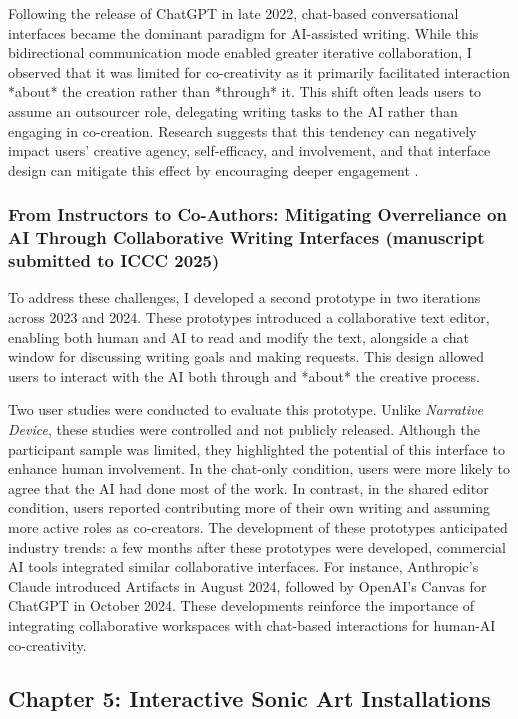 Following the release of ChatGPT in late 2022, chat-based conversational interfaces became the dominant paradigm for AI-assisted writing. While this bidirectional communication mode enabled greater iterative collaboration, I observed that it was limited for co-creativity as it primarily facilitated interaction *about* the creation rather than *through* it. This shift often leads users to assume an outsourcer role, delegating writing tasks to the AI rather than engaging in co-creation. Research suggests that this tendency can negatively impact users’ creative agency, self-efficacy, and involvement, and that interface design can mitigate this effect by encouraging deeper engagement \cite{Kantosalo2016-hg, McGuire2024-im}.

\subsubsection{From Instructors to Co-Authors: Mitigating Overreliance on AI Through Collaborative Writing Interfaces (manuscript submitted to ICCC 2025)} To address these challenges, I developed a second prototype in two iterations across 2023 and 2024. These prototypes introduced a collaborative text editor, enabling both human and AI to read and modify the text, alongside a chat window for discussing writing goals and making requests. This design allowed users to interact with the AI both through and *about* the creative process. 

Two user studies were conducted to evaluate this prototype. Unlike \textit{Narrative Device}, these studies were controlled and not publicly released. Although the participant sample was limited, they highlighted the potential of this interface to enhance human involvement. In the chat-only condition, users were more likely to agree that the AI had done most of the work. In contrast, in the shared editor condition, users reported contributing more of their own writing and assuming more active roles as co-creators. The development of these prototypes anticipated industry trends: a few months after these prototypes were developed, commercial AI tools integrated similar collaborative interfaces. For instance, Anthropic’s Claude introduced Artifacts in August 2024, followed by OpenAI’s Canvas for ChatGPT in October 2024. These developments reinforce the importance of integrating collaborative workspaces with chat-based interactions for human-AI co-creativity.

\subsection{Chapter 5: Interactive Sonic Art Installations}

